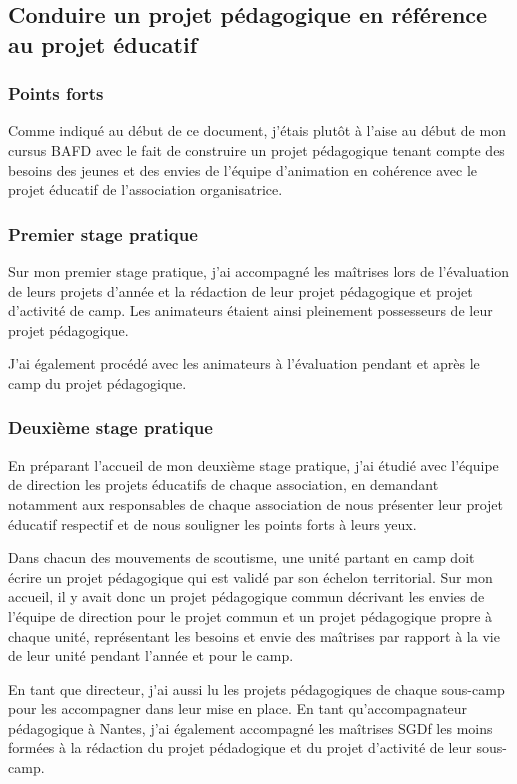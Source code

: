 \documentclass[titlepage,11pt,a4paper]{article}
\begin{document}
\subsection{Conduire un projet pédagogique en référence au projet éducatif}

\subsubsection{Points forts}

Comme indiqué au début de ce document, j'étais plutôt à l'aise au début de mon cursus BAFD
avec le fait de construire un projet pédagogique tenant compte des besoins des jeunes et des
envies de l'équipe d'animation en cohérence avec le projet éducatif de l'association
organisatrice.

\subsubsection{Premier stage pratique}


Sur mon premier stage pratique, j'ai accompagné les maîtrises lors de l'évaluation de
leurs projets d'année et la rédaction de leur projet pédagogique et projet d'activité de
camp. Les animateurs étaient ainsi pleinement possesseurs de leur projet pédagogique.

J'ai également procédé avec les animateurs à l'évaluation pendant et après le camp du
projet pédagogique.

\subsubsection{Deuxième stage pratique}

En préparant l'accueil de mon deuxième stage pratique, j'ai étudié avec l'équipe de
direction les projets éducatifs de chaque association, en demandant notamment aux
responsables de chaque association de nous présenter leur projet éducatif respectif
et de nous souligner les points forts à leurs yeux.

Dans chacun des mouvements de scoutisme, une unité partant en camp doit écrire un
projet pédagogique qui est validé par son échelon territorial. Sur mon accueil, il y avait
donc un projet pédagogique commun décrivant les envies de l'équipe de direction pour le
projet commun et un projet pédagogique propre à chaque unité, représentant les besoins et
envie des maîtrises par rapport à la vie de leur unité pendant l'année et pour le camp.

En tant que directeur, j'ai aussi lu les projets pédagogiques de chaque sous-camp pour les
accompagner dans leur mise en place. En tant qu'accompagnateur pédagogique à Nantes, j'ai
également accompagné les maîtrises SGDf les moins formées à la rédaction du projet
pédadogique et du projet d'activité de leur sous-camp.
\end{document}
